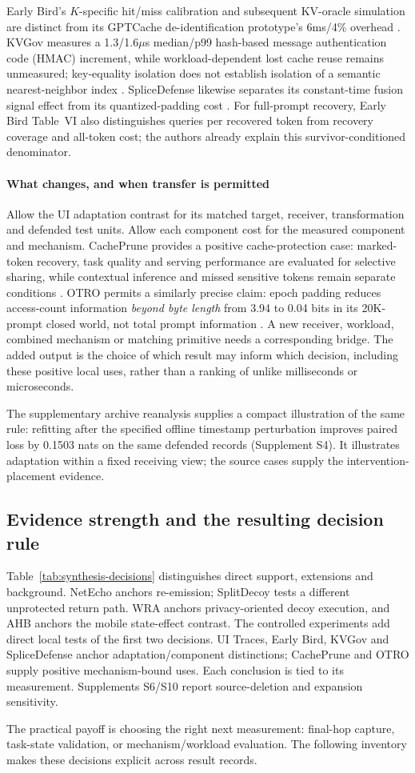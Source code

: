 Early Bird's $K$-specific hit/miss calibration and subsequent KV-oracle simulation are distinct from its GPTCache de-identification prototype's 6ms/4\% overhead \cite{earlybird2025}. KVGov measures a 1.3/1.6$\mu$s median/p99 hash-based message authentication code (HMAC) increment, while workload-dependent lost cache reuse remains unmeasured; key-equality isolation does not establish isolation of a semantic nearest-neighbor index \cite{addagada2026kvgov}. SpliceDefense likewise separates its constant-time fusion signal effect from its quantized-padding cost \cite{spliceleak2026}. For full-prompt recovery, Early Bird Table~VI also distinguishes queries per recovered token from recovery coverage and all-token cost; the authors already explain this survivor-conditioned denominator.

\paragraph{What changes, and when transfer is permitted}
Allow the UI adaptation contrast for its matched target, receiver, transformation and defended test units. Allow each component cost for the measured component and mechanism. CachePrune provides a positive cache-protection case: marked-token recovery, task quality and serving performance are evaluated for selective sharing, while contextual inference and missed sensitive tokens remain separate conditions \cite{wu2026cacheprune}. OTRO permits a similarly precise claim: epoch padding reduces access-count information \emph{beyond byte length} from 3.94 to 0.04 bits in its 20K-prompt closed world, not total prompt information \cite{lee2026otro}. A new receiver, workload, combined mechanism or matching primitive needs a corresponding bridge. The added output is the choice of which result may inform which decision, including these positive local uses, rather than a ranking of unlike milliseconds or microseconds.

The supplementary archive reanalysis supplies a compact illustration of the same rule: refitting after the specified offline timestamp perturbation improves paired loss by 0.1503 nats on the same defended records (Supplement S4). It illustrates adaptation within a fixed receiving view; the source cases supply the intervention-placement evidence.

\subsection{Evidence strength and the resulting decision rule}
Table~\ref{tab:synthesis-decisions} distinguishes direct support, extensions and background. NetEcho anchors re-emission; SplitDecoy tests a different unprotected return path. WRA anchors privacy-oriented decoy execution, and AHB anchors the mobile state-effect contrast. The controlled experiments add direct local tests of the first two decisions. UI Traces, Early Bird, KVGov and SpliceDefense anchor adaptation/component distinctions; CachePrune and OTRO supply positive mechanism-bound uses. Each conclusion is tied to its measurement. Supplements S6/S10 report source-deletion and expansion sensitivity.


The practical payoff is choosing the right next measurement: final-hop capture, task-state validation, or mechanism/workload evaluation. The following inventory makes these decisions explicit across result records.
